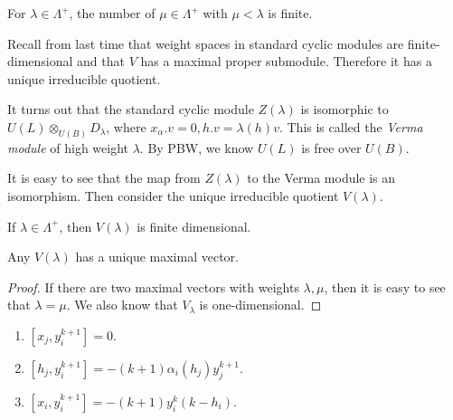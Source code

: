 \documentclass[twoside, 10pt]{article}
\begin{document}
    \begin{prop}
        For $\lambda \in \Lambda^+$, the number of $\mu \in \Lambda^+$ with $\mu < \lambda$ is finite.
    \end{prop}

    Recall from last time that weight spaces in standard cyclic modules are finite-dimensional and that $V$ has a maximal proper submodule. Therefore it has a unique irreducible quotient. 

    It turns out that the standard cyclic module $Z(\lambda)$ is isomorphic to $U(L) \otimes_{U(B)} D_{\lambda}$, where $x_{\alpha}.v = 0, h.v = \lambda(h)v$. This is called the \textit{Verma module} of high weight $\lambda$. By PBW, we know $U(L)$ is free over $U(B)$.

    It is easy to see that the map from $Z(\lambda)$ to the Verma module is an isomorphism. Then consider the unique irreducible quotient $V(\lambda)$.

    \begin{thm}
        If $\lambda \in \Lambda^+$, then $V(\lambda)$ is finite dimensional.
    \end{thm}
    
    \begin{lem}
        Any $V(\lambda)$ has a unique maximal vector. 
    \end{lem}

    \begin{proof}
        If there are two maximal vectors with weights $\lambda, \mu$, then it is easy to see that $\lambda = \mu$. We also know that $V_{\lambda}$ is one-dimensional.
    \end{proof}

    \begin{lem}
        \begin{enumerate}
            \item $[x_j, y_i^{k+1}] = 0$.
            \item $[h_j, y_i^{k+1}] = -(k+1) \alpha_i(h_j) y_j^{k+1}$.
            \item $[x_i, y_i^{k+1}] = -(k+1) y_i^k(k-h_i)$.
        \end{enumerate}
    \end{lem}
\end{document}
